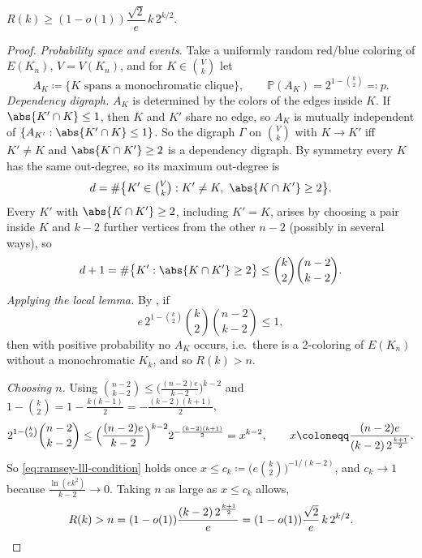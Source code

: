 \begin{theorem}\label{thm:ramsey-lll}
    \(R(k) \ge (1 - o(1)) \dfrac{\sqrt{2}}{e} \, k \, 2^{k/2}\).
\end{theorem}

\begin{proof}
    \emph{Probability space and events.} Take a uniformly random red/blue coloring of \(E(K_{n})\), \(V = V(K_n)\), and for \(K \in \binom{V}{k}\) let
    \[
        A_{K} \coloneqq \{ K \text{ spans a monochromatic clique} \},
        \qquad
        \mathbb{P}(A_{K}) = 2^{1 - \binom{k}{2}} \eqqcolon p .
    \]
    \emph{Dependency digraph.} \(A_{K}\) is determined by the colors of the edges inside \(K\). If \(\abs{K' \cap K} \le 1\), then \(K\) and \(K'\) share no edge, so \(A_{K}\) is mutually independent of \(\{ A_{K'} : \abs{K' \cap K} \le 1 \}\). So the digraph \(\Gamma\) on \(\binom{V}{k}\) with \(K \to K'\) iff \(K' \ne K\) and \(\abs{K \cap K'} \ge 2\) is a dependency digraph. By symmetry every \(K\) has the same out-degree, so its maximum out-degree is
    \[
        d = \# \bigl\{ K' \in \tbinom{V}{k} : K' \ne K,\ \abs{K \cap K'} \ge 2 \bigr\} .
    \]
    Every \(K'\) with \(\abs{K \cap K'} \ge 2\), including \(K' = K\), arises by choosing a pair inside \(K\) and \(k-2\) further vertices from the other \(n-2\) (possibly in several ways), so
    \[
        d + 1 = \# \bigl\{ K' : \abs{K \cap K'} \ge 2 \bigr\} \le \binom{k}{2} \binom{n-2}{k-2} .
    \]
    \emph{Applying the local lemma.} By , if
    \begin{equation}\label{eq:ramsey-lll-condition}
        e \, 2^{1 - \binom{k}{2}} \binom{k}{2} \binom{n-2}{k-2} \le 1 ,
    \end{equation}
    then with positive probability no \(A_{K}\) occurs, i.e.\ there is a 2-coloring of \(E(K_{n})\) without a monochromatic \(K_{k}\), and so \(R(k) > n\).

    \emph{Choosing \(n\).} Using \(\binom{n-2}{k-2} \le \bigl( \frac{(n-2)e}{k-2} \bigr)^{k-2}\) and \(1 - \binom{k}{2} = 1 - \frac{k(k-1)}{2} = -\frac{(k-2)(k+1)}{2}\),
    \[
        2^{1 - \binom{k}{2}} \binom{n-2}{k-2} \le \Bigl( \frac{(n-2)e}{k-2} \Bigr)^{k-2} 2^{-\frac{(k-2)(k+1)}{2}} = x^{k-2},
        \qquad
        x \coloneqq \frac{(n-2)e}{(k-2) \, 2^{\frac{k+1}{2}}} .
    \]
    So \eqref{eq:ramsey-lll-condition} holds once \(x \le c_{k} \coloneqq \bigl( e\binom{k}{2} \bigr)^{-1/(k-2)}\), and \(c_{k} \to 1\) because \(\frac{\ln(e k^{2})}{k-2} \to 0\). Taking \(n\) as large as \(x \le c_{k}\) allows,
    \[
        R(k) > n = (1 - o(1)) \frac{(k-2) \, 2^{\frac{k+1}{2}}}{e} = (1 - o(1)) \frac{\sqrt{2}}{e} \, k \, 2^{k/2} . \qedhere
    \]
\end{proof}
